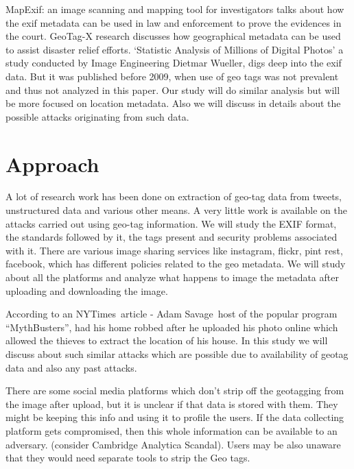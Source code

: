 \documentclass[12pt]{extarticle}
\begin{document}
\begin{normalsize}
\vspace{10}

		MapExif: an image scanning and mapping tool for investigators talks about how the exif metadata can be used in law and enforcement to prove the evidences in the court. GeoTag-X research discusses how geographical metadata can be used to assist disaster relief efforts. ‘Statistic Analysis of Millions of Digital Photos’ a study conducted by Image Engineering Dietmar Wueller, digs deep into the exif data. But it was published before 2009, when use of geo tags was not prevalent and thus not analyzed in this paper. Our study will do similar analysis but will be more focused on location metadata. Also we will discuss in details about the possible attacks originating from such data.

		\section{Approach}
		A lot of research work has been done on extraction of geo-tag data from tweets, unstructured data and various other means. A very little work is available on the attacks carried out using geo-tag information. We will study the EXIF format, the standards followed by it, the tags present and security problems associated with it. There are various image sharing services like instagram, flickr, pint rest, facebook, which has different policies related to the geo metadata. We will study about all the platforms and analyze what happens to image the metadata after uploading and downloading the image.

\vspace{10}


According to an NYTimes article - Adam Savage host of the popular program “MythBusters”, had his home robbed after he uploaded his photo online which allowed the thieves to extract the location of his house. In this study we will discuss about such similar attacks which are possible due to availability of geotag data and also any past attacks.

\vspace{10}


There are some social media platforms which don’t strip off the geotagging from the image after upload, but it is unclear if that data is stored with them. They might be keeping this info and using it to profile the users. If the data collecting platform gets compromised, then this whole information can be available to an adversary. (consider Cambridge Analytica Scandal). Users may be also unaware that they would need separate tools to strip the Geo tags.


\end{normalsize}
\end{document}
